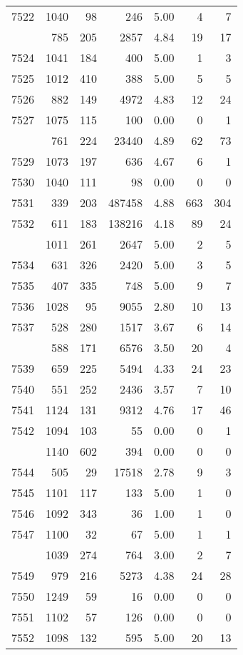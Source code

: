 \documentclass[
]{article}
\begin{document}
\begin{table}
\begin{tabular}[t]{lrrrrrr}
7522 & 1040 & 98 & 246 & 5.00 & 4 & 7\\
\addlinespace
7523 & 785 & 205 & 2857 & 4.84 & 19 & 17\\
7524 & 1041 & 184 & 400 & 5.00 & 1 & 3\\
7525 & 1012 & 410 & 388 & 5.00 & 5 & 5\\
7526 & 882 & 149 & 4972 & 4.83 & 12 & 24\\
7527 & 1075 & 115 & 100 & 0.00 & 0 & 1\\
\addlinespace
7528 & 761 & 224 & 23440 & 4.89 & 62 & 73\\
7529 & 1073 & 197 & 636 & 4.67 & 6 & 1\\
7530 & 1040 & 111 & 98 & 0.00 & 0 & 0\\
7531 & 339 & 203 & 487458 & 4.88 & 663 & 304\\
7532 & 611 & 183 & 138216 & 4.18 & 89 & 24\\
\addlinespace
7533 & 1011 & 261 & 2647 & 5.00 & 2 & 5\\
7534 & 631 & 326 & 2420 & 5.00 & 3 & 5\\
7535 & 407 & 335 & 748 & 5.00 & 9 & 7\\
7536 & 1028 & 95 & 9055 & 2.80 & 10 & 13\\
7537 & 528 & 280 & 1517 & 3.67 & 6 & 14\\
\addlinespace
7538 & 588 & 171 & 6576 & 3.50 & 20 & 4\\
7539 & 659 & 225 & 5494 & 4.33 & 24 & 23\\
7540 & 551 & 252 & 2436 & 3.57 & 7 & 10\\
7541 & 1124 & 131 & 9312 & 4.76 & 17 & 46\\
7542 & 1094 & 103 & 55 & 0.00 & 0 & 1\\
\addlinespace
7543 & 1140 & 602 & 394 & 0.00 & 0 & 0\\
7544 & 505 & 29 & 17518 & 2.78 & 9 & 3\\
7545 & 1101 & 117 & 133 & 5.00 & 1 & 0\\
7546 & 1092 & 343 & 36 & 1.00 & 1 & 0\\
7547 & 1100 & 32 & 67 & 5.00 & 1 & 1\\
\addlinespace
7548 & 1039 & 274 & 764 & 3.00 & 2 & 7\\
7549 & 979 & 216 & 5273 & 4.38 & 24 & 28\\
7550 & 1249 & 59 & 16 & 0.00 & 0 & 0\\
7551 & 1102 & 57 & 126 & 0.00 & 0 & 0\\
7552 & 1098 & 132 & 595 & 5.00 & 20 & 13\\

\end{tabular}
\end{table}
\end{document}
